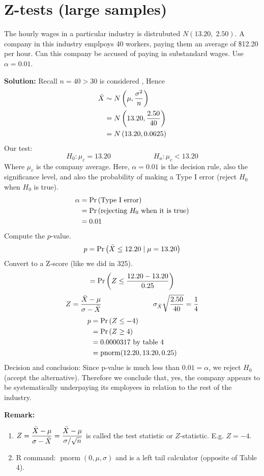 \section{Z-tests (large samples)}
The hourly wages in a particular industry is distrubuted $N(13.20,\; 2.50)$. A company in this industry emplpoys 40 workers, paying them an average of \$12.20 per hour. Can this company be accused of paying in substandard wages. Use $\alpha = 0.01$.

\nnl \textbf{Solution:} Recall $n=40 > 30$ is considered , Hence
\begin{align*}
    \Xbar &\sim \normalDist{\mu, \frac{\sigma^2}{n}} \\
    &= \normalDist{13.20, \frac{2.50}{40}} \\
    &= \normalDist{13.20, 0.0625}
\end{align*}
Our test:
$$H_0 : \mu_c = 13.20 \hspace{1in} H_a : \mu_c < 13.20$$
Where $\mu_c$ is the company average. Here, $\alpha = 0.01$ is the decision rule, also the significance level, and also the probability of making a Type I error (reject $H_0$ when $H_0$ is true).
\begin{align*}
    \alpha &= \P{\text{Type I error}}\\
    &= \P{\text{rejecting } H_0 \text{ when it is true}}\\
    &= 0.01
\end{align*}
Compute the $p$-value.
$$p = \P{\Xbar \leq 12.20 \mid \mu = 13.20}$$
Convert to a Z-score (like we did in 325).
$$= \P{Z \leq \frac{12.20-13.20}{0.25}}$$
$$Z = \frac{\Xbar - \mu}{\sigma-{\Xbar}} \hspace{1in} \sigma_{\Xbar} \sqrt{\frac{2.50}{40}} = \over{4}$$
\begin{align*}
    p &= \P{Z \leq -4}\\
    &= \P{Z \geq 4}\\
    &= 0.0000317 \text{ by table 4}\\
    &= \operatorname{pnorm}(12.20, 13.20, 0.25)
\end{align*}
Decision and conclusion:
Since p-value is much less than $0.01 = \alpha$, we reject $H_0$ (accept the alternative). Therefore we conclude that, yes, the company appears to be systematically underpaying its employees in relation to the rest of the industry.

\nnl \textbf{Remark:} 
\begin{enumerate}[label=\textcircled{\raisebox{-1pt}{\arabic*}}]
\item $\displaystyle Z = \frac{\bar{X} - \mu}{\sigma-{\bar{X}}} = \frac{\bar{X} - \mu}{\sigma / \sqrt{n}}$
is called the {\color{neonorange}test statistic} or $Z$-statistic. E.g. $Z = -4$.
\item R command: $\operatorname{pnorm}(0, \mu, \sigma)$ and is a left tail calculator (opposite of Table 4).
\end{enumerate}

